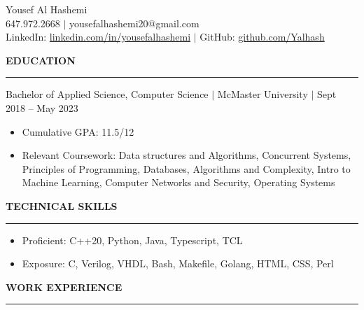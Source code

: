 \documentclass[12pt]{article}
\newcommand{\sectionRule}{\textcolor{gray}{\rule{7.27in}{0.02cm}}}
\newcommand{\sectionTxt}[1]{\noindent\textbf{#1}\\}
\newcommand{\textDate}[3]{\noindent#1 $|$ #2 $|$ {\color{textGray} #3}}
\begin{document}
    \begin{center}
        {\huge Yousef Al Hashemi}\\
        {\normalsize 647.972.2668 $|$ yousefalhashemi20@gmail.com}\\
        {\normalsize LinkedIn: \href{https://www.linkedin.com/in/yousefalhashemi}{linkedin.com/in/yousefalhashemi} $|$ GitHub: \href{https://github.com/Yalhash}{github.com/Yalhash}}\\
    \end{center}

    \sectionTxt{EDUCATION}
    \sectionRule

    \textDate{Bachelor of Applied Science, Computer Science}{McMaster University}{Sept 2018 -- May 2023}
    \begin{small}
        \begin{itemize}
            \itemsep0em 
            \item Cumulative GPA: {\color{textGray} 11.5/12}
            \item Relevant Coursework: {\color{textGray} Data structures and Algorithms, Concurrent Systems, Principles of Programming, Databases, Algorithms and Complexity, Intro to Machine Learning, Computer Networks and Security, Operating Systems}
        \end{itemize}
    \end{small}

    \sectionTxt{TECHNICAL SKILLS}
    \sectionRule
    \begin{small}
        \begin{itemize}
            \itemsep0em 
            \item Proficient: {\color{textGray}C++20, Python, Java, Typescript, TCL}
            \item Exposure: {\color{textGray}C, Verilog, VHDL, Bash, Makefile, Golang, HTML, CSS, Perl}
        \end{itemize}
    \end{small}
    \sectionTxt{WORK EXPERIENCE}
    \sectionRule
\end{document}
